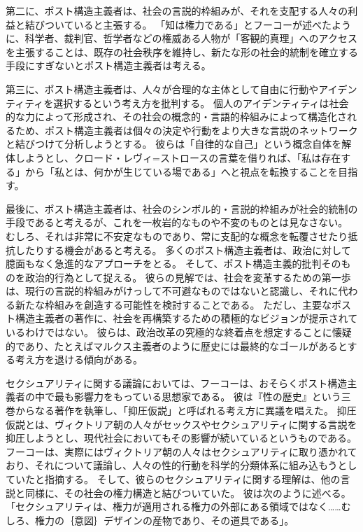 \documentclass[paper=a4,book,openany]{jlreq}
\begin{document}
第二に、ポスト構造主義者は、社会の言説的枠組みが、それを支配する人々の利益と結びついていると主張する。
「知は権力である」とフーコーが述べたように、科学者、裁判官、哲学者などの権威ある人物が「客観的真理」へのアクセスを主張することは、既存の社会秩序を維持し、新たな形の社会的統制を確立する手段にすぎないとポスト構造主義者は考える。

第三に、ポスト構造主義者は、人々が合理的な主体として自由に行動やアイデンティティを選択するという考え方を批判する。
個人のアイデンティティは社会的な力によって形成され、その社会の概念的・言語的枠組みによって構造化されるため、ポスト構造主義者は個々の決定や行動をより大きな言説のネットワークと結びつけて分析しようとする。
彼らは「自律的な自己」という概念自体を解体しようとし、クロード・レヴィ=ストロースの言葉を借りれば、「私は存在する」から「私とは、何かが生じている場である」へと視点を転換することを目指す。

最後に、ポスト構造主義者は、社会のシンボル的・言説的枠組みが社会的統制の手段であると考えるが、これを一枚岩的なものや不変のものとは見なさない。
むしろ、それは非常に不安定なものであり、常に支配的な概念を転覆させたり抵抗したりする機会があると考える。
多くのポスト構造主義者は、政治に対して臆面もなく急進的なアプローチをとる。
そして、ポスト構造主義的批判そのものを政治的行為として捉える。
彼らの見解では、社会を変革するための第一歩は、現行の言説的枠組みがけっして不可避なものではないと認識し、それに代わる新たな枠組みを創造する可能性を検討することである。
ただし、主要なポスト構造主義者の著作に、社会を再構築するための積極的なビジョンが提示されているわけではない。
彼らは、政治改革の究極的な終着点を想定することに懐疑的であり、たとえばマルクス主義者のように歴史には最終的なゴールがあるとする考え方を退ける傾向がある。

セクシュアリティに関する議論においては、フーコーは、おそらくポスト構造主義者の中で最も影響力をもっている思想家である。
彼は『性の歴史』という三巻からなる著作を執筆し、「抑圧仮説」と呼ばれる考え方に異議を唱えた。
抑圧仮説とは、ヴィクトリア朝の人々がセックスやセクシュアリティに関する言説を抑圧しようとし、現代社会においてもその影響が続いているというものである。
フーコーは、実際にはヴィクトリア朝の人々はセクシュアリティに取り憑かれており、それについて議論し、人々の性的行動を科学的分類体系に組み込もうとしていたと指摘する。
そして、彼らのセクシュアリティに関する理解は、他の言説と同様に、その社会の権力構造と結びついていた。
彼は次のように述べる。
「セクシュアリティは、権力が適用される権力の外部にある領域ではなく……むしろ、権力の｛意図｝{デザイン}の産物であり、その道具である」\citep[p.152]{foucault81:_histor_sexual}。
\end{document}
